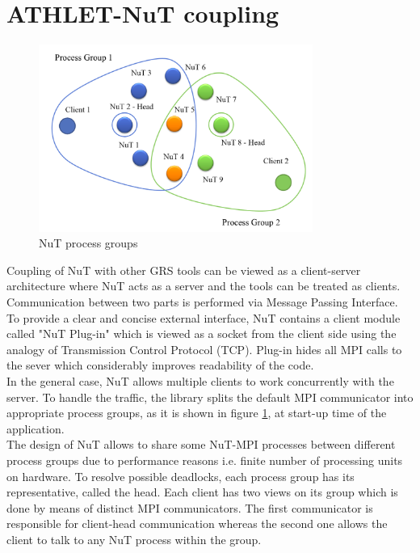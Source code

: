 \section{ATHLET-NuT coupling}

\figpointer{\ref{fig:introduction-nut-process-groups}}
\begin{figure}[htpb]
  \centering
  \includegraphics[width=0.8\textwidth]{figures/introduction-nut-process-groups.png}
\caption{NuT process groups}
\label{fig:introduction-nut-process-groups}
\end{figure}

Coupling of NuT with other GRS tools can be viewed as a client-server architecture where NuT acts as a server and the tools can be treated as clients. Communication between two parts is performed via Message Passing Interface.\\


To provide a clear and concise external interface, NuT contains a client module called "NuT Plug-in" which is viewed as a socket from the client side using the analogy of Transmission Control Protocol (TCP). Plug-in hides all MPI calls to the sever which considerably improves readability of the code.\\


In the general case, NuT allows multiple clients to work concurrently with the server. To handle the traffic, the library splits the default MPI communicator into appropriate process groups, as it is shown in figure \ref{fig:introduction-nut-process-groups}, at start-up time of the application.\\



The design of NuT allows to share some NuT-MPI processes between different process groups due to performance reasons i.e. finite number of processing units on hardware. To resolve possible deadlocks, each process group has its representative, called the head. Each client has two views on its group which is done by means of distinct MPI communicators. The first communicator is responsible for client-head communication whereas the second one allows the client to talk to any NuT process within the group.\\


